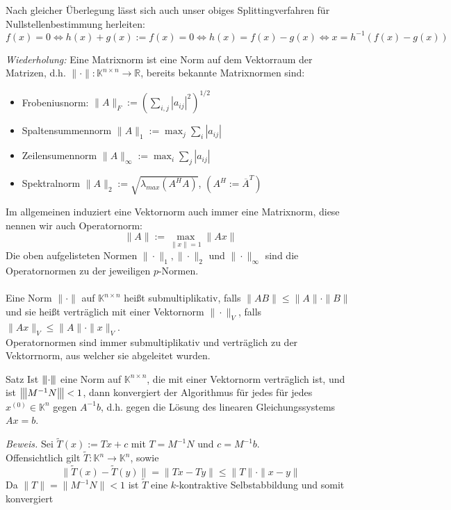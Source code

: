 \begin{rembox}
    Nach gleicher Überlegung lässt sich auch unser obiges Splittingverfahren für Nullstellenbestimmung herleiten:
    \[f(x)=0\Leftrightarrow h(x)+g(x):=f(x) = 0 \Leftrightarrow h(x)=f(x)-g(x) \Leftrightarrow x=h^{-1}(f(x)-g(x))\]
\end{rembox}
\textit{Wiederholung:} Eine Matrixnorm ist eine Norm auf dem Vektorraum der Matrizen, 
d.h. $\|\cdot\|:\mathbb{K}^{n\times n}\rightarrow \mathbb{R}$, bereits bekannte Matrixnormen sind:
\begin{itemize}
    \item Frobeniusnorm: $\|A\|_F := \left(\displaystyle \sum_{i,j}|a_{ij}|^2\right)^{1/2}$
    \item Spaltensummennorm $\|A\|_1:=\max_j \sum_i |a_{ij}|$
    \item Zeilensumennorm $\|A\|_\infty:=\max_i \sum_j |a_{ij}|$
    \item Spektralnorm $\|A\|_2:=\sqrt{\lambda_{max}(A^HA)}$, \qquad $(A^H := \overline{A}^T)$
\end{itemize}
Im allgemeinen induziert eine Vektornorm auch immer eine Matrixnorm, diese nennen wir auch Operatornorm:
\[\|A\|:=\max_{\|x\|=1}\|Ax\|\]
Die oben aufgelisteten Normen $\|\cdot\|_1,\|\cdot\|_2$ und $\|\cdot\|_\infty$ sind die Operatornormen zu 
der jeweiligen $p$-Normen. \\ \\
Eine Norm $\|\cdot\|$ auf $\mathbb{K}^{n\times n}$ heißt submultiplikativ, falls $\|AB\|\leq\|A\|\cdot\|B\|$ 
und sie heißt verträglich mit einer Vektornorm $\|\cdot\|_V$, falls $\|Ax\|_V\leq \|A\|\cdot\|x\|_V$. \\
Operatornormen sind immer submultiplikativ und verträglich zu der Vektorrnorm, aus welcher sie abgeleitet wurden.
\begin{thmbox}{Satz}
    Ist ${\left\vert\kern-0.25ex\left\vert\kern-0.25ex\left\vert \cdot \right\vert\kern-0.25ex\right\vert\kern-0.25ex\right\vert}$ eine Norm auf $\mathbb{K}^{n\times n}$, die mit einer Vektornorm verträglich ist, 
    und ist ${\left\vert\kern-0.25ex\left\vert\kern-0.25ex\left\vert M^{-1}N \right\vert\kern-0.25ex\right\vert\kern-0.25ex\right\vert}<1$, dann konvergiert der Algorithmus für jedes für jedes $x^{(0)}\in\mathbb{K}^n$ 
    gegen $A^{-1}b$, d.h. gegen die Lösung des linearen Gleichungssystems $Ax=b$.
\end{thmbox}
\textit{Beweis.} Sei $\tilde{T}(x) := Tx + c$ mit $T=M^{-1}N$ und $c=M^{-1}b$.\\
Offensichtlich gilt $\tilde{T}:\mathbb{K}^n\rightarrow\mathbb{K}^n$, sowie 
\[\|\tilde{T}(x)-\tilde{T}(y)\| = \|Tx-Ty\|\leq \|T\|\cdot\|x-y\|\]
Da $\|T\|=\|M^{-1}N\|<1$ ist $\tilde{T}$ eine $k$-kontraktive Selbstabbildung und somit konvergiert 
